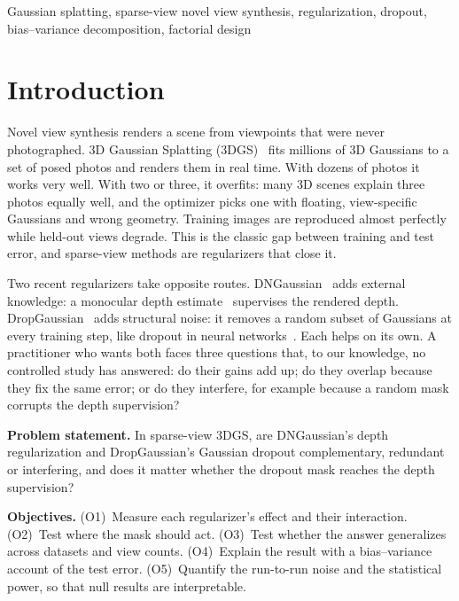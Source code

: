 \documentclass[conference]{IEEEtran}
\begin{document}
\begin{IEEEkeywords}
Gaussian splatting, sparse-view novel view synthesis, regularization, dropout, bias--variance decomposition, factorial design
\end{IEEEkeywords}

\section{Introduction}
Novel view synthesis renders a scene from viewpoints that were never photographed. 3D Gaussian Splatting (3DGS)~\cite{kerbl2023gaussian} fits millions of 3D Gaussians to a set of posed photos and renders them in real time. With dozens of photos it works very well. With two or three, it overfits: many 3D scenes explain three photos equally well, and the optimizer picks one with floating, view-specific Gaussians and wrong geometry. Training images are reproduced almost perfectly while held-out views degrade. This is the classic gap between training and test error, and sparse-view methods are regularizers that close it.

Two recent regularizers take opposite routes. DNGaussian~\cite{li2024dngaussian} adds external knowledge: a monocular depth estimate~\cite{ranftl2021dpt} supervises the rendered depth. DropGaussian~\cite{park2025dropgaussian} adds structural noise: it removes a random subset of Gaussians at every training step, like dropout in neural networks~\cite{srivastava2014dropout}. Each helps on its own. A practitioner who wants both faces three questions that, to our knowledge, no controlled study has answered: do their gains add up; do they overlap because they fix the same error; or do they interfere, for example because a random mask corrupts the depth supervision?

\textbf{Problem statement.} In sparse-view 3DGS, are DNGaussian's depth regularization and DropGaussian's Gaussian dropout complementary, redundant or interfering, and does it matter whether the dropout mask reaches the depth supervision?

\textbf{Objectives.} (O1)~Measure each regularizer's effect and their interaction. (O2)~Test where the mask should act. (O3)~Test whether the answer generalizes across datasets and view counts. (O4)~Explain the result with a bias--variance account of the test error. (O5)~Quantify the run-to-run noise and the statistical power, so that null results are interpretable.
\end{document}
